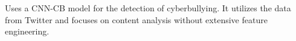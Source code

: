 Uses a CNN-CB model for the detection of cyberbullying. It utilizes the data from Twitter and focuses on content analysis without extensive feature engineering.
